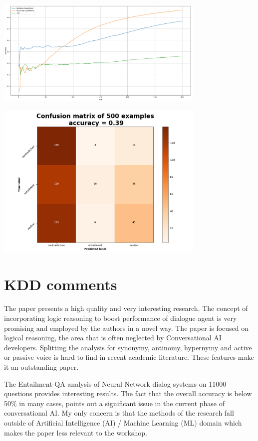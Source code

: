 \begin{center}
\includegraphics[width=10.0cm]{img/training_acc_EntailQA_mem.png}
\end{center}


\begin{center}
\includegraphics[width=10.0cm]{img/cm_mem_EntailQA2.png}
\end{center}


\section{KDD comments}
The paper presents a high quality and very interesting research. The concept of incorporating logic reasoning to boost performance of dialogue agent is very promising and employed by the authors in a novel way. The paper is focused on logical reasoning, the area that is often neglected by Conversational AI developers. Splitting the analysis for synonymy, antinomy, hypernymy and active or passive voice is hard to find in recent academic literature. These features make it an outstanding paper.

The Entailment-QA analysis of Neural Network dialog systems on 11000 questions provides interesting results. The fact that the overall accuracy is below 50$\%$ in many cases, points out a significant issue in the current phase of conversational AI. My only concern is that the methods of the research fall outside of Artificial Intelligence (AI) / Machine Learning (ML) domain which makes the paper less relevant to the workshop.

